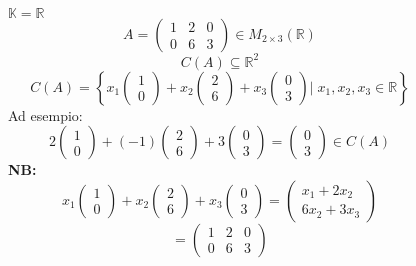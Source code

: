 \documentclass[a4paper]{article}
\theoremstyle{break}
\theoremstyle{break}
\theoremstyle{break}
\theoremstyle{break}
\begin{document}
\begin{figure}[H]
  \begin{example}
    \( \mathbb{K} = \mathbb{R} \) 
    \[
      A = \begin{pmatrix} 
        1 & 2 & 0\\
        0 & 6 & 3
      \end{pmatrix}  \in M_{2 \times 3}(\mathbb{R})
    \] 
    \[
    C(A) \subseteq \mathbb{R}^2
    \] 
    \[
      C(A) = \left\{ x_1 \begin{pmatrix} 1\\0 \end{pmatrix} 
        + x_2 \begin{pmatrix} 2\\6 \end{pmatrix}
        + x_3 \begin{pmatrix} 0\\3 \end{pmatrix} \Big |\; x_1,x_2,x_3 \in \mathbb{R} \right\}
    \] 
    Ad esempio:
    \[
    2 \begin{pmatrix} 1\\0 \end{pmatrix}  + (-1) \begin{pmatrix} 2\\6 \end{pmatrix} + 3 \begin{pmatrix} 0\\3 \end{pmatrix} = \begin{pmatrix} 0\\3 \end{pmatrix} \in C(A)
    \] 
    \textbf{NB:}
    \[
    x_1 \begin{pmatrix} 1\\0 \end{pmatrix} + x_2 \begin{pmatrix} 2\\6 \end{pmatrix} + x_3 \begin{pmatrix} 0\\3 \end{pmatrix} = \begin{pmatrix} x_1 + 2x_2\\6x_2 + 3x_3 \end{pmatrix}
    \] 
    \[
     = \begin{pmatrix} 
       1 & 2 & 0\\
       0 & 6 & 3
     \end{pmatrix} 
\]
\end{example}
\end{figure}
\end{document}
